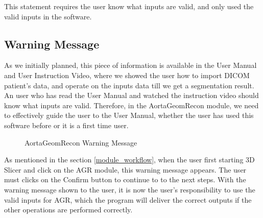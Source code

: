 This statement requires the user know what inputs are valid, and only used the valid inputs in the software.

\subsection{Warning Message}

As we initially planned, this piece of information is available in the User Manual and User Instruction Video, where we showed the user how to import DICOM patient's data, and operate on the inputs data till we get a segmentation result. An user who has read the User Manual and watched the instruction video should know what inputs are valid. Therefore, in the AortaGeomRecon module, we need to effectively guide the user to the User Manual, whether the user has used this software before or it is a first time user.

\begin{figure}[H]
    \centering
    \caption[AortaGeomRecon Warning Message]{AortaGeomRecon Warning Message}
    \label{fig_agr_ac_wm}
\end{figure}

As mentioned in the section \ref{module_workflow}, when the user first starting 3D Slicer and click on the AGR module, this warning message appears. The user must clicks on the Confirm button to continue to to the next steps. With the warning message shown to the user, it is now the user's responsibility to use the valid inputs for AGR, which the program will deliver the correct outputs if the other operations are performed correctly. 



